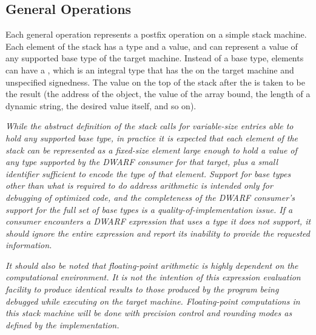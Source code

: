 \subsection{General Operations}
\label{chap:generaloperations}
Each general operation represents a postfix operation on
a simple stack machine. 
Each element of the stack has a type and a value, and can represent
a value of any supported base type of the target machine.  Instead of
a base type, elements can have a 
,
which is an integral type that has the 
 on the target machine and 
unspecified signedness. The value on the top of the stack after 
 the 
is 
taken to be the result (the address of the object, the
value of the array bound, the length of a dynamic string,
the desired value itself, and so on).

\textit{While the abstract definition of the stack calls for variable-size entries
able to hold any supported base type, in practice it is expected that each
element of the stack can be represented as a fixed-size element large enough
to hold a value of any type supported by the DWARF consumer for that target,
plus a small identifier sufficient to encode the type of that element.
Support for base types other than what is required to do address arithmetic
is intended only for debugging of optimized code, and the completeness of the
DWARF consumer's support for the full set of base types is a
quality-of-implementation issue. If a consumer encounters a DWARF expression
that uses a type it does not support, it should ignore the entire expression
and report its inability to provide the requested information.}

\textit{It should also be noted that floating-point arithmetic is highly dependent
on the computational environment. It is not the intention of this expression
evaluation facility to produce identical results to those produced by the
program being debugged while executing on the target machine. Floating-point
computations in this stack machine will be done with precision control and
rounding modes as defined by the implementation.}

